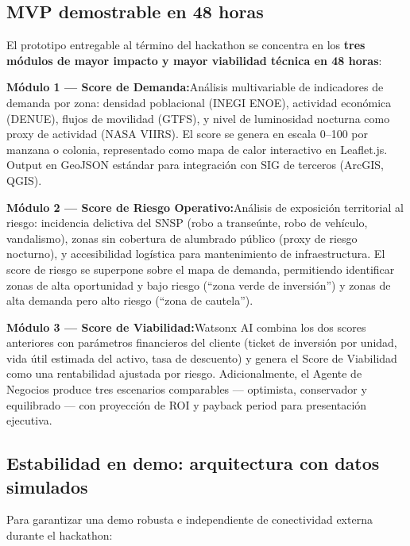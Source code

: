 \documentclass[12pt,a4paper]{article}
\newcommand{\capamvp}[2]{%
  \noindent\textbf{\color{negro}#1}\quad #2\par\vspace{4pt}%
}
\begin{document}
\subsection{MVP demostrable en 48 horas}

El prototipo entregable al término del hackathon se concentra en los \textbf{tres módulos de mayor impacto y mayor viabilidad técnica en 48 horas}:

\begin{tcolorbox}[cajasecundaria, title=Módulos del MVP — Completamente Funcionales en Demo]
\capamvp{Módulo 1 — Score de Demanda:}{Análisis multivariable de indicadores de demanda por zona: densidad poblacional (INEGI ENOE), actividad económica (DENUE), flujos de movilidad (GTFS), y nivel de luminosidad nocturna como proxy de actividad (NASA VIIRS). El score se genera en escala 0–100 por manzana o colonia, representado como mapa de calor interactivo en Leaflet.js. Output en GeoJSON estándar para integración con SIG de terceros (ArcGIS, QGIS).}

\smallskip
\capamvp{Módulo 2 — Score de Riesgo Operativo:}{Análisis de exposición territorial al riesgo: incidencia delictiva del SNSP (robo a transeúnte, robo de vehículo, vandalismo), zonas sin cobertura de alumbrado público (proxy de riesgo nocturno), y accesibilidad logística para mantenimiento de infraestructura. El score de riesgo se superpone sobre el mapa de demanda, permitiendo identificar zonas de alta oportunidad y bajo riesgo (``zona verde de inversión'') y zonas de alta demanda pero alto riesgo (``zona de cautela'').}

\smallskip
\capamvp{Módulo 3 — Score de Viabilidad:}{Watsonx AI combina los dos scores anteriores con parámetros financieros del cliente (ticket de inversión por unidad, vida útil estimada del activo, tasa de descuento) y genera el Score de Viabilidad como una rentabilidad ajustada por riesgo. Adicionalmente, el Agente de Negocios produce tres escenarios comparables — optimista, conservador y equilibrado — con proyección de ROI y payback period para presentación ejecutiva.}
\end{tcolorbox}

\subsection{Estabilidad en demo: arquitectura con datos simulados}

Para garantizar una demo robusta e independiente de conectividad externa durante el hackathon:
\end{document}

